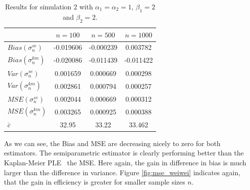 \begin{table}[h!]
	\begin{center}
		\begin{tabular}{| l || c | c | c |}
			\hline
			&       $n=100$   &    $n=500$    &    $n=1000$\\
			\hline
			\hline
			$Bias(\sigma_n^{se})$ & -0.019606 & -0.000239 & 0.003782\\
			$Bias(\sigma_n^{km})$ & -0.020086 & -0.011439 & -0.011422\\
			\hline
			$Var(\sigma_n^{se})$ & 0.001659 & 0.000669 & 0.000298\\
			$Var(\sigma_n^{km})$ & 0.002861 & 0.000794 & 0.000257\\
			\hline
			$MSE(\sigma_n^{se})$ & 0.002044 & 0.000669 & 0.000312\\
			$MSE(\sigma_n^{km})$ & 0.003265 & 0.000925 & 0.000388\\
			\hline
			\hline
			$\bar c$ & 32.95 & 33.22 & 33.462\\
			\hline
		\end{tabular}
	\end{center}
	\caption{Results for simulation 2 with  $\alpha_1 = \alpha_2 = 1$, $\beta_1 = 2$ and $\beta_2 = 2$.}
	\label{tab:res_weiwei1}
\end{table}
%
As we can see, the Bias and MSE are decreasing nicely to zero for both estimators. The semiparametric estimator is clearly performing better than the Kaplan-Meier PLE \wrt\ the MSE. Here again, the gain in difference in bias is much larger than the difference in variance. Figure \ref{fig:mse_weiwei} indicates again, that the gain in efficiency is greater for smaller sample sizes $n$.
